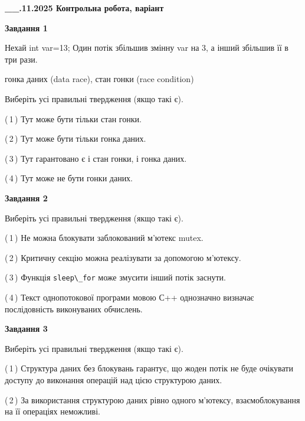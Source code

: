 \documentclass[12pt, ukrainian]{article}
\def\code#1{\Verb!#1!}
\begin{document}
\begin {large}

\textbf{\_\_.11.2025 Контрольна робота, варіант  }\par


{

\begin{center}
\textbf{Завдання 1}
\end{center}
Нехай int var=13; Один потік збільшив змінну var на 3, а інший збільшив її в три рази.

гонка даних (data race), стан гонки (race condition)

Виберіть усі правильні твердження (якщо такі є).\par
\vspace{2mm}
(\,1\,) Тут може бути тільки стан гонки.%

(\,2\,) Тут може бути тільки гонка даних.%

(\,3\,) Тут гарантовано є і стан гонки, і гонка даних.%

(\,4\,) Тут може не бути гонки даних.%



\begin{center}
\textbf{Завдання 2}
\end{center}
Виберіть усі правильні твердження (якщо такі є).\par
\vspace{2mm}

(\,1\,) Не можна блокувати заблокований м’ютекс mutex.%

(\,2\,) Критичну секцію можна реалізувати за допомогою м’ютексу.%

(\,3\,) Функція \code{sleep\_for} може змусити інший потік заснути.%

(\,4\,) Текст однопотокової програми мовою С++ однозначно визначає послідовність виконуваних обчислень.%



\begin{center}
\textbf{Завдання 3}
\end{center}
Виберіть усі правильні твердження (якщо такі є).\par
\vspace{2mm}

(\,1\,) Структура даних без блокувань гарантує, що жоден потік не буде очікувати доступу до виконання операцій над цією структурою даних.%

(\,2\,) За використання структурою даних рівно одного м’ютексу, взаємоблокування на її операціях неможливі.%

}
\end{large}
\end{document}
